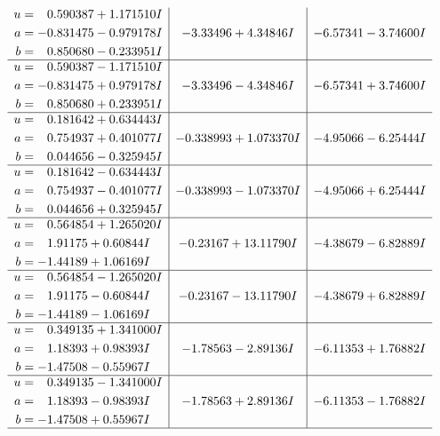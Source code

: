 \documentclass[1p]{elsarticle_modified}
\theoremstyle{definition}
\begin{document}
$$\begin{array}{c|c|c}
\begin{aligned}
u &= \phantom{-}0.590387 + 1.171510 I \\
a &= -0.831475 - 0.979178 I \\
b &= \phantom{-}0.850680 - 0.233951 I\end{aligned}
 & -3.33496 + 4.34846 I & -6.57341 - 3.74600 I \\ \hline\begin{aligned}
u &= \phantom{-}0.590387 - 1.171510 I \\
a &= -0.831475 + 0.979178 I \\
b &= \phantom{-}0.850680 + 0.233951 I\end{aligned}
 & -3.33496 - 4.34846 I & -6.57341 + 3.74600 I \\ \hline\begin{aligned}
u &= \phantom{-}0.181642 + 0.634443 I \\
a &= \phantom{-}0.754937 + 0.401077 I \\
b &= \phantom{-}0.044656 - 0.325945 I\end{aligned}
 & -0.338993 + 1.073370 I & -4.95066 - 6.25444 I \\ \hline\begin{aligned}
u &= \phantom{-}0.181642 - 0.634443 I \\
a &= \phantom{-}0.754937 - 0.401077 I \\
b &= \phantom{-}0.044656 + 0.325945 I\end{aligned}
 & -0.338993 - 1.073370 I & -4.95066 + 6.25444 I \\ \hline\begin{aligned}
u &= \phantom{-}0.564854 + 1.265020 I \\
a &= \phantom{-}1.91175 + 0.60844 I \\
b &= -1.44189 + 1.06169 I\end{aligned}
 & -0.23167 + 13.11790 I & -4.38679 - 6.82889 I \\ \hline\begin{aligned}
u &= \phantom{-}0.564854 - 1.265020 I \\
a &= \phantom{-}1.91175 - 0.60844 I \\
b &= -1.44189 - 1.06169 I\end{aligned}
 & -0.23167 - 13.11790 I & -4.38679 + 6.82889 I \\ \hline\begin{aligned}
u &= \phantom{-}0.349135 + 1.341000 I \\
a &= \phantom{-}1.18393 + 0.98393 I \\
b &= -1.47508 - 0.55967 I\end{aligned}
 & -1.78563 - 2.89136 I & -6.11353 + 1.76882 I \\ \hline\begin{aligned}
u &= \phantom{-}0.349135 - 1.341000 I \\
a &= \phantom{-}1.18393 - 0.98393 I \\
b &= -1.47508 + 0.55967 I\end{aligned}
 & -1.78563 + 2.89136 I & -6.11353 - 1.76882 I\\
 \hline 
 \end{array}$$\newpage\newpage\renewcommand{\arraystretch}{1}
\end{document}

